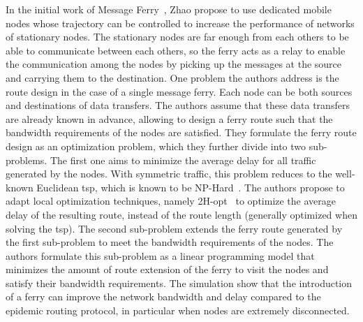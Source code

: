 In the initial work of Message Ferry~\cite{zhao2003message}, Zhao \etal propose to use dedicated mobile nodes whose trajectory can be controlled to increase the performance of networks of stationary nodes. The stationary nodes are far enough from each others to be able to communicate between each others, so the ferry acts as a relay to enable the communication among the nodes by picking up the messages at the source and carrying them to the destination. One problem the authors address is the route design in the case of a single message ferry. Each node can be both sources and destinations of data transfers. The authors assume that these data transfers are already known in advance, allowing to design a ferry route such that the bandwidth requirements of the nodes are satisfied. They formulate the ferry route design as an optimization problem, which they further divide into two sub-problems. The first one aims to minimize the average delay for all traffic generated by the nodes. With symmetric traffic, this problem reduces to the well-known Euclidean \acrfull{tsp}, which is known to be NP-Hard~\cite{papadimitriou1977euclidean}. The authors propose to adapt local optimization techniques, namely 2H-opt~\cite{bentley1992fast} to optimize the average delay of the resulting route, instead of the route length (generally optimized when solving the \acrshort{tsp}). The second sub-problem extends the ferry route generated by the first sub-problem to meet the bandwidth requirements of the nodes. The authors formulate this sub-problem as  a linear programming model that minimizes the amount of route extension of the ferry to visit the nodes and satisfy their bandwidth requirements. The simulation show that the introduction of a ferry can improve the network bandwidth and delay compared to the epidemic routing protocol, in particular when nodes are extremely disconnected.

